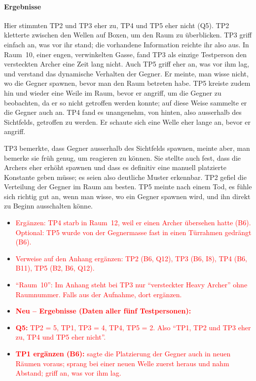 \documentclass[../Main.tex]{subfiles}
\begin{document}
\paragraph{Ergebnisse}
Hier stimmten TP2 und TP3 eher zu, TP4 und TP5 eher nicht (Q5). TP2 kletterte zwischen den Wellen auf Boxen, um den Raum zu überblicken. TP3 griff einfach an, was vor ihr stand; die vorhandene Information reichte ihr also aus. In Raum~10, einer engen, verwinkelten Gasse, fand TP3 als einzige Testperson den versteckten Archer eine Zeit lang nicht. Auch TP5 griff eher an, was vor ihm lag, und verstand das dynamische Verhalten der Gegner. Er meinte, man wisse nicht, wo die Gegner spawnen, bevor man den Raum betreten habe. TP5 kreiste zudem hin und wieder eine Weile im Raum, bevor er angriff, um die Gegner zu beobachten, da er so nicht getroffen werden konnte; auf diese Weise sammelte er die Gegner auch an. TP4 fand es unangenehm, von hinten, also ausserhalb des Sichtfelds, getroffen zu werden. Er schaute sich eine Welle eher lange an, bevor er angriff.

TP3 bemerkte, dass Gegner ausserhalb des Sichtfelds spawnen, meinte aber, man bemerke sie früh genug, um reagieren zu können. Sie stellte auch fest, dass die Archers eher erhöht spawnen und dass es definitiv eine manuell platzierte Konstante geben müsse; es seien also deutliche Muster erkennbar. TP2 gefiel die Verteilung der Gegner im Raum am besten. TP5 meinte nach einem Tod, es fühle sich richtig gut an, wenn man wisse, wo ein Gegner spawnen wird, und ihn direkt zu Beginn ausschalten könne.

\begin{itemize}[leftmargin=1.5cm]
    \item \textcolor{red}{Ergänzen: TP4 starb in Raum~12, weil er einen Archer übersehen hatte (B6). Optional: TP5 wurde von der Gegnermasse fast in einen Türrahmen gedrängt (B6).}
    \item \textcolor{red}{Verweise auf den Anhang ergänzen: TP2 (B6, Q12), TP3 (B6, I8), TP4 (B6, B11), TP5 (B2, B6, Q12).}
    \item \textcolor{red}{\enquote{Raum~10}: Im Anhang steht bei TP3 nur \enquote{versteckter Heavy Archer} ohne Raumnummer. Falls aus der Aufnahme, dort ergänzen.}
\end{itemize}

\begin{itemize}[leftmargin=1.5cm]
    \item \textcolor{red}{\textbf{Neu -- Ergebnisse (Daten aller fünf Testpersonen):}}
    \item \textcolor{red}{\textbf{Q5:} TP2 = 5, TP1, TP3 = 4, TP4, TP5 = 2. Also \enquote{TP1, TP2 und TP3 eher zu, TP4 und TP5 eher nicht}.}
    \item \textcolor{red}{\textbf{TP1 ergänzen (B6):} sagte die Platzierung der Gegner auch in neuen Räumen voraus; sprang bei einer neuen Welle zuerst heraus und nahm Abstand; griff an, was vor ihm lag.}
\end{itemize}
\end{document}
